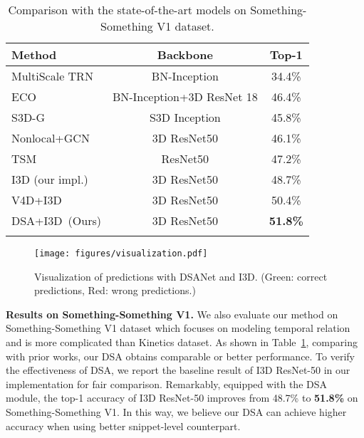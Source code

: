 \documentclass[sigconf]{acmart}
\begin{document}
{{\begin{table}[h]
\caption{Comparison with the state-of-the-art models on Something-Something V1 dataset.}
\begin{center}
\begin{tabular}{lcc}
\shline
{ Method} & { Backbone} &  {Top-1} \\
\hline
MultiScale TRN~\cite{trn} & BN-Inception & 34.4\% \\
ECO~\cite{eco} & BN-Inception+3D ResNet 18 & 46.4\% \\
S3D-G~\cite{s3d} & {S3D Inception} & 45.8\% \\
Nonlocal+GCN~\cite{gcn} &{3D ResNet50} & 46.1\%  \\
TSM~\cite{tsm} & {ResNet50} & 47.2\% \\
I3D (our impl.) & {3D ResNet50} & 48.7\% \\
V4D+I3D ~\cite{zhang2020v4d} &{3D ResNet50}  & 50.4\%  \\
\hline
DSA+I3D~(Ours) &{3D ResNet50}  & \textbf{51.8\%}  \\
\shline
\end{tabular}
\end{center}
\label{cmp_sthv1}
\end{table} 

\begin{figure*}[t]
    \centering
    \texttt{[image: figures/visualization.pdf]}
    \caption{Visualization of predictions with DSANet and I3D.  (\textcolor[RGB]{0,176,80}{Green}: correct predictions,  \textcolor[RGB]{246,0,0}{Red}: wrong predictions.)}
    \label{fig:vis}
\end{figure*} 


\textbf{Results on Something-Something V1.}
We also evaluate our method on Something-Something V1 dataset which focuses on modeling temporal relation and is more complicated than Kinetics dataset.
As shown in Table~\ref{cmp_sthv1}, comparing with prior works, our DSA obtains comparable or better performance.
To verify the effectiveness of DSA, we report the baseline result of I3D ResNet-50 in our implementation for fair comparison. 
Remarkably, equipped with the DSA module, the top-1 accuracy of I3D ResNet-50 improves from 48.7\% to \textbf{51.8\%} on Something-Something V1.
In this way, we believe our DSA can achieve higher accuracy when using better snippet-level counterpart.









}}
\end{document}
